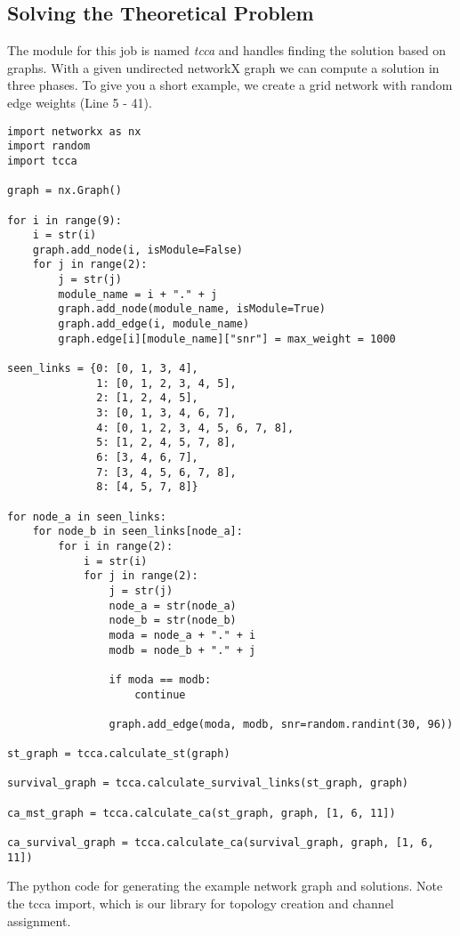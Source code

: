   \subsection{Solving the Theoretical Problem}
    The module for this job is named \textit{tcca} and handles finding the solution based on graphs.
    With a given undirected networkX graph we can compute a solution in three phases.
    To give you a short example, we create a grid network with random edge weights (Line 5 - 41).
    \begin{table}
      \lstset{language=Python}
      \begin{lstlisting}
import networkx as nx
import random
import tcca

graph = nx.Graph()

for i in range(9):
    i = str(i)
    graph.add_node(i, isModule=False)
    for j in range(2):
        j = str(j)
        module_name = i + "." + j
        graph.add_node(module_name, isModule=True)
        graph.add_edge(i, module_name)
        graph.edge[i][module_name]["snr"] = max_weight = 1000

seen_links = {0: [0, 1, 3, 4], 
              1: [0, 1, 2, 3, 4, 5], 
              2: [1, 2, 4, 5], 
              3: [0, 1, 3, 4, 6, 7], 
              4: [0, 1, 2, 3, 4, 5, 6, 7, 8], 
              5: [1, 2, 4, 5, 7, 8], 
              6: [3, 4, 6, 7], 
              7: [3, 4, 5, 6, 7, 8], 
              8: [4, 5, 7, 8]}

for node_a in seen_links:
    for node_b in seen_links[node_a]:
        for i in range(2):
            i = str(i)
            for j in range(2):
                j = str(j)
                node_a = str(node_a)
                node_b = str(node_b)
                moda = node_a + "." + i
                modb = node_b + "." + j

                if moda == modb:
                    continue

                graph.add_edge(moda, modb, snr=random.randint(30, 96))

st_graph = tcca.calculate_st(graph)

survival_graph = tcca.calculate_survival_links(st_graph, graph)

ca_mst_graph = tcca.calculate_ca(st_graph, graph, [1, 6, 11])

ca_survival_graph = tcca.calculate_ca(survival_graph, graph, [1, 6, 11])
      \end{lstlisting}
      \caption{The python code for generating the example network graph and solutions. Note the tcca import, 
      which is our library for topology creation and channel assignment.}
    \end{table}
    
